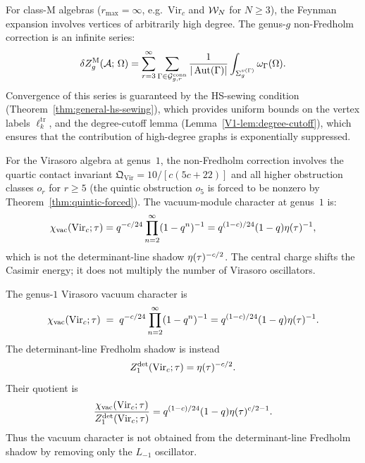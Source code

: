 \begin{remark}%
%
For class-M algebras ($r_{\max} = \infty$, e.g.\ $\mathrm{Vir}_c$
and $\mathcal{W}_N$ for $N \geq 3$), the Feynman expansion involves
vertices of arbitrarily high degree. The genus-$g$ non-Fredholm
correction is an infinite series:
\[
\delta Z_g^{\mathrm{M}}(\mathcal{A};\,\Omega)
= \sum_{r=3}^{\infty}
\sum_{\Gamma \in \mathcal{G}^{\mathrm{conn}}_{g,r}}
\frac{1}{|\operatorname{Aut}(\Gamma)|}
\int_{\Sigma_g^{v(\Gamma)}}
\omega_\Gamma(\Omega).
\]
Convergence of this series is guaranteed by the HS-sewing
condition (Theorem~\ref{thm:general-hs-sewing}), which provides
uniform bounds on the vertex labels $\ell_k^{\mathrm{tr}}$, and
the degree-cutoff lemma (Lemma~\ref{V1-lem:degree-cutoff}), which
ensures that the contribution of high-degree graphs is
exponentially suppressed.

For the Virasoro algebra at genus~$1$, the non-Fredholm
correction involves the quartic contact invariant
$\mathfrak{Q}_{\mathrm{Vir}} = 10/[c(5c+22)]$
and all higher obstruction classes $o_r$ for $r \geq 5$
(the quintic obstruction $o_5$ is forced to be nonzero
by Theorem~\ref{thm:quintic-forced}). The vacuum-module character at
genus~$1$ is:
\[
\chi_{\mathrm{vac}}(\mathrm{Vir}_c;\tau)
=q^{-c/24}\prod_{n=2}^{\infty}(1-q^n)^{-1}
=q^{(1-c)/24}(1-q)\eta(\tau)^{-1},
\]
which is not the determinant-line shadow
\(\eta(\tau)^{-c/2}\). The central charge shifts the Casimir
energy; it does not multiply the number of Virasoro oscillators.
\end{remark}

\begin{proposition}%
%
The genus-$1$ Virasoro vacuum character is
\begin{equation}%
\chi_{\mathrm{vac}}(\mathrm{Vir}_c;\tau)
\;=\;
q^{-c/24}\prod_{n=2}^{\infty}(1-q^n)^{-1}
=q^{(1-c)/24}(1-q)\dedeta(\tau)^{-1}.
\end{equation}
The determinant-line Fredholm shadow is instead
\[
Z^{\mathrm{det}}_1(\mathrm{Vir}_c;\tau)=\eta(\tau)^{-c/2}.
\]
Their quotient is
\[
\frac{\chi_{\mathrm{vac}}(\mathrm{Vir}_c;\tau)}
{Z^{\mathrm{det}}_1(\mathrm{Vir}_c;\tau)}
=q^{(1-c)/24}(1-q)\eta(\tau)^{c/2-1}.
\]
Thus the vacuum character is not obtained from the determinant-line Fredholm
shadow by removing only the \(L_{-1}\) oscillator.
\end{proposition}

